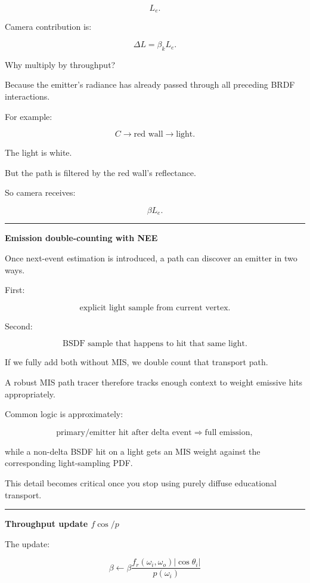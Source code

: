 \[
L_e.
\]

Camera contribution is:

\[
\boxed{
\Delta L
=
\beta_kL_e.
}
\]

Why multiply by throughput?

Because the emitter's radiance has already passed through all preceding BRDF interactions.

For example:

\[
C\rightarrow\text{red wall}\rightarrow\text{light}.
\]

The light is white.

But the path is filtered by the red wall's reflectance.

So camera receives:

\[
\beta L_e.
\]

\begin{center}\rule{0.5\linewidth}{0.5pt}\end{center}

\textbf{Emission double-counting with NEE}

Once next-event estimation is introduced, a path can discover an emitter in two ways.

First:

\[
\text{explicit light sample from current vertex}.
\]

Second:

\[
\text{BSDF sample that happens to hit that same light}.
\]

If we fully add both without MIS, we double count that transport path.

A robust MIS path tracer therefore tracks enough context to weight emissive hits appropriately.

Common logic is approximately:

\[
\text{primary/emitter hit after delta event}
\Rightarrow
\text{full emission},
\]

while a non-delta BSDF hit on a light gets an MIS weight against the corresponding light-sampling PDF.

This detail becomes critical once you stop using purely diffuse educational transport.

\begin{center}\rule{0.5\linewidth}{0.5pt}\end{center}

\textbf{Throughput update \(f\cos/p\)}

The update:

\[
\boxed{
\beta
\leftarrow
\beta
\frac{
f_r(\omega_i,\omega_o)
|\cos\theta_i|
}{
p(\omega_i)
}
}
\]

